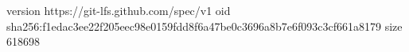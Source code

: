 version https://git-lfs.github.com/spec/v1
oid sha256:f1edac3ee22f205eec98e0159fdd8f6a47be0c3696a8b7e6f093c3cf661a8179
size 618698
